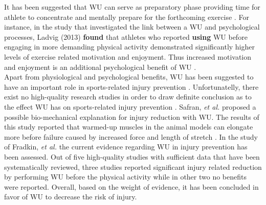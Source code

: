 It has been suggested that WU can serve as preparatory phase providing time for athlete to concentrate and mentally prepare for the forthcoming exercise \cite{shellock1985warming}. 
For instance, in the study that investigated the link between a WU and psychological processes, Ladvig (2013) \textbf{found} that athletes who reported \textbf{using} WU before engaging in more demanding physical activity demonstrated significantly higher levels of exercise related motivation and enjoyment. Thus increased motivation and enjoyment is an additional psychological benefit of WU \cite{ladwig2013psychological}.
\\Apart from physiological and psychological benefits, WU has been suggested to have an important role in sports-related injury prevention \cite{shellock1985warming}. Unfortunatelly, there exist no high-quality research studies in order to draw definite conclusion as to the effect WU has on sports-related injury prevention \cite{fields2007should}. Safran, \textit{et al.} proposed a possible bio-mechanical explanation for injury reduction with WU. The results of this study reported that warmed-up muscles in the animal models can elongate more before failure caused by increased force and length of stretch \cite{safran1989warm}. In the study of Fradkin, \textit{et al.} the current evidence regarding WU in injury prevention has been assessed. Out of five high-quality studies with sufficient data that have been systematically reviewed, three studies reported significant injury related reduction by performing WU before the physical activity while in other two no benefits were reported. Overall, based on the weight of evidence, it has been concluded in favor of WU to decrease the risk of injury.\\
